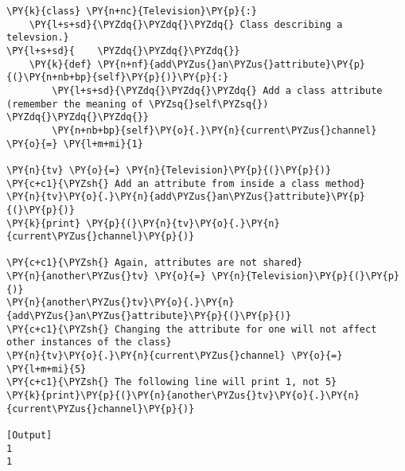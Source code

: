 \begin{Verbatim}[label=\makebox{\url{https://github.com/lucabaldini/cmepda/tree/master/slides/latex/snippets/class\_attributes\_2.py}},commandchars=\\\{\}]
\PY{k}{class} \PY{n+nc}{Television}\PY{p}{:}
    \PY{l+s+sd}{\PYZdq{}\PYZdq{}\PYZdq{} Class describing a televsion.}
\PY{l+s+sd}{    \PYZdq{}\PYZdq{}\PYZdq{}}
    \PY{k}{def} \PY{n+nf}{add\PYZus{}an\PYZus{}attribute}\PY{p}{(}\PY{n+nb+bp}{self}\PY{p}{)}\PY{p}{:}
        \PY{l+s+sd}{\PYZdq{}\PYZdq{}\PYZdq{} Add a class attribute (remember the meaning of \PYZsq{}self\PYZsq{}) \PYZdq{}\PYZdq{}\PYZdq{}}
        \PY{n+nb+bp}{self}\PY{o}{.}\PY{n}{current\PYZus{}channel} \PY{o}{=} \PY{l+m+mi}{1}

\PY{n}{tv} \PY{o}{=} \PY{n}{Television}\PY{p}{(}\PY{p}{)}
\PY{c+c1}{\PYZsh{} Add an attribute from inside a class method}
\PY{n}{tv}\PY{o}{.}\PY{n}{add\PYZus{}an\PYZus{}attribute}\PY{p}{(}\PY{p}{)}
\PY{k}{print} \PY{p}{(}\PY{n}{tv}\PY{o}{.}\PY{n}{current\PYZus{}channel}\PY{p}{)}

\PY{c+c1}{\PYZsh{} Again, attributes are not shared}
\PY{n}{another\PYZus{}tv} \PY{o}{=} \PY{n}{Television}\PY{p}{(}\PY{p}{)}
\PY{n}{another\PYZus{}tv}\PY{o}{.}\PY{n}{add\PYZus{}an\PYZus{}attribute}\PY{p}{(}\PY{p}{)}
\PY{c+c1}{\PYZsh{} Changing the attribute for one will not affect other instances of the class}
\PY{n}{tv}\PY{o}{.}\PY{n}{current\PYZus{}channel} \PY{o}{=} \PY{l+m+mi}{5}
\PY{c+c1}{\PYZsh{} The following line will print 1, not 5}
\PY{k}{print}\PY{p}{(}\PY{n}{another\PYZus{}tv}\PY{o}{.}\PY{n}{current\PYZus{}channel}\PY{p}{)}

[Output]
1
1
\end{Verbatim}